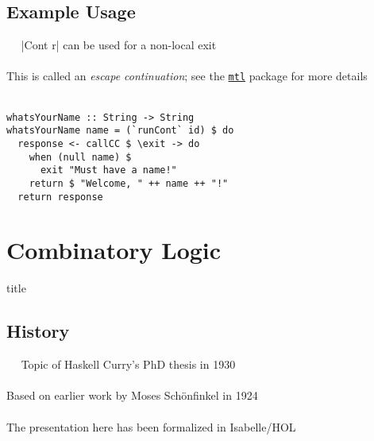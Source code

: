 \documentclass{beamer}
\begin{document}
\subsection{Example Usage}
\begin{frame}[fragile]{\insertsectionhead\ \textemdash\
    \insertsubsectionhead}
  |Cont r| can be used for a non-local exit \\~\\

  This is called an \emph{escape continuation}; see the \href{https://hackage.haskell.org/package/mtl-2.2.2/docs/Control-Monad-Cont.html\#g:5}{\texttt{mtl}} package for more details\\~\\

\begin{lstlisting}
whatsYourName :: String -> String
whatsYourName name = (`runCont` id) $ do
  response <- callCC $ \exit -> do
    when (null name) $
      exit "Must have a name!"
    return $ "Welcome, " ++ name ++ "!"
  return response
\end{lstlisting}
\end{frame}

\section{Combinatory Logic}
\begin{frame}[plain]
  \vfill \centering
  \begin{beamercolorbox}[sep=8pt,center,shadow=true,rounded=true]{title}
    \usebeamerfont{title}\insertsectionhead\par%
  \end{beamercolorbox}
  \vfill
\end{frame}

\subsection{History}
\begin{frame}[plain]{\insertsectionhead\ \textemdash\
    \insertsubsectionhead}
Topic of Haskell Curry's PhD thesis in 1930 \cite{curryGrundlagenKombinatorischenLogik1930}\\~\\

Based on earlier work by Moses Sch\"onfinkel in 1924 \cite{schoenfinkelUeberBausteineMathematischen1924}\\~\\

The presentation here has been formalized in Isabelle/HOL
\end{frame}
\end{document}
